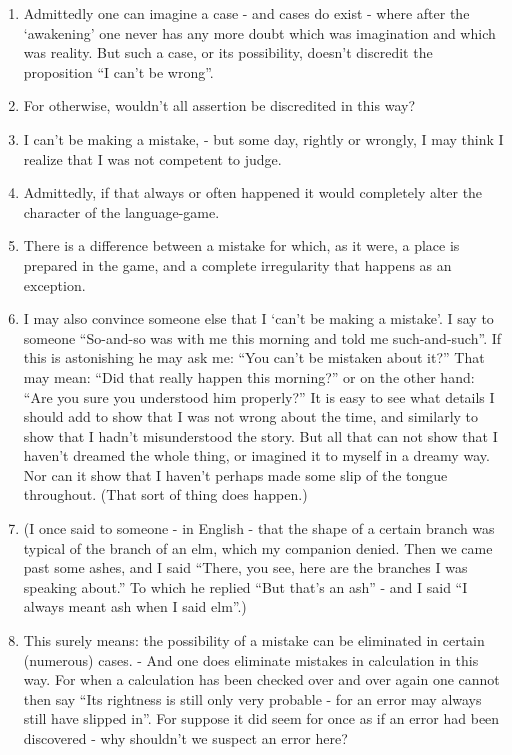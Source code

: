 \documentclass{book}
\begin{document}
\begin{enumerate}
\item
Admittedly one can imagine a case - and cases do exist - where after the
`awakening' one never has any more doubt which was imagination and which was
reality. But such a case, or its possibility, doesn't discredit the proposition
``I can't be wrong''.

\item
For otherwise, wouldn't all assertion be discredited in this way?

\item
I can't be making a mistake, - but some day, rightly or wrongly, I may think I
realize that I was not competent to judge.

\item
Admittedly, if that always or often happened it would completely alter the
character of the language-game.

\item
There is a difference between a mistake for which, as it were, a place is
prepared in the game, and a complete irregularity that happens as an exception.

\item
I may also convince someone else that I `can't be making a mistake'.  I say to
someone ``So-and-so was with me this morning and told me such-and-such''. If
this is astonishing he may ask me: ``You can't be mistaken about it?'' That may
mean: ``Did that really happen this morning?'' or on the other hand: ``Are you
sure you understood him properly?'' It is easy to see what details I should add
to show that I was not wrong about the time, and similarly to show that I
hadn't misunderstood the story. But all that can not show that I haven't
dreamed the whole thing, or imagined it to myself in a dreamy way. Nor can it
show that I haven't perhaps made some slip of the tongue throughout. (That sort
of thing does happen.)

\item
(I once said to someone - in English - that the shape of a certain branch was
typical of the branch of an elm, which my companion denied. Then we came past
some ashes, and I said ``There, you see, here are the branches I was speaking
about.'' To which he replied ``But that's an ash'' - and I said ``I always
meant ash when I said elm''.)

\item
This surely means: the possibility of a mistake can be eliminated in certain
(numerous) cases. - And one does eliminate mistakes in calculation in this way.
For when a calculation has been checked over and over again one cannot then say
``Its rightness is still only very probable - for an error may always still
have slipped in''. For suppose it did seem for once as if an error had been
discovered - why shouldn't we suspect an error here?


\end{enumerate}
\end{document}
